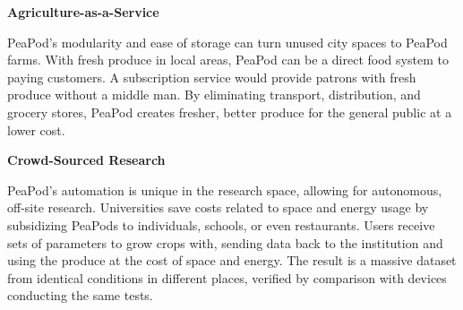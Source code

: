 \documentclass{../tex/report}
\begin{document}


\textbf{Agriculture-as-a-Service}

PeaPod’s modularity and ease of storage can turn unused city spaces to PeaPod farms. With fresh produce in local areas, PeaPod can be a direct food system to paying customers. A subscription service would provide patrons with fresh produce without a middle man. By eliminating transport, distribution, and grocery stores, PeaPod creates fresher, better produce for the general public at a lower cost.

\textbf{Crowd-Sourced Research}

PeaPod's automation is unique in the research space, allowing for autonomous, off-site research. Universities save costs related to space and energy usage by subsidizing PeaPods to individuals, schools, or even restaurants. Users receive sets of parameters to grow crops with, sending data back to the institution and using the produce at the cost of space and energy. The result is a massive dataset from identical conditions in different places, verified by comparison with devices conducting the same tests.
\end{document}
